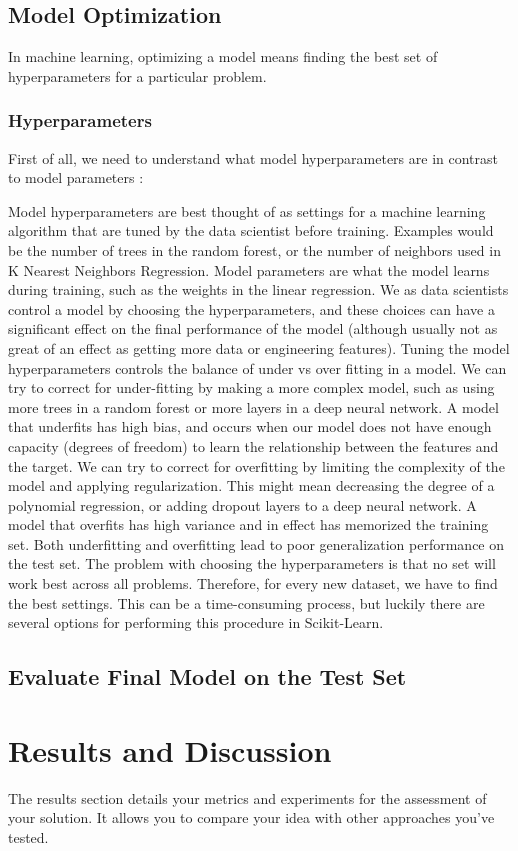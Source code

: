 \documentclass{article}
\begin{document}
\subsection*{Model Optimization}
In machine learning, optimizing a model means finding the best set of hyperparameters for a particular problem.

\subsubsection*{Hyperparameters}
First of all, we need to understand what model hyperparameters are in contrast to model parameters :

Model hyperparameters are best thought of as settings for a machine learning algorithm that are tuned by the data scientist before training. Examples would be the number of trees in the random forest, or the number of neighbors used in K Nearest Neighbors Regression.
Model parameters are what the model learns during training, such as the weights in the linear regression. We as data scientists control a model by choosing the hyperparameters, and these choices can have a significant effect on the final performance of the model (although usually not as great of an effect as getting more data or engineering features). Tuning the model hyperparameters controls the balance of under vs over fitting in a model. We can try to correct for under-fitting by making a more complex model, such as using more trees in a random forest or more layers in a deep neural network. A model that underfits has high bias, and occurs when our model does not have enough capacity (degrees of freedom) to learn the relationship between the features and the target. We can try to correct for overfitting by limiting the complexity of the model and applying regularization. This might mean decreasing the degree of a polynomial regression, or adding dropout layers to a deep neural network. A model that overfits has high variance and in effect has memorized the training set. Both underfitting and overfitting lead to poor generalization performance on the test set.
The problem with choosing the hyperparameters is that no set will work best across all problems. Therefore, for every new dataset, we have to find the best settings. This can be a time-consuming process, but luckily there are several options for performing this procedure in Scikit-Learn.


\subsection*{Evaluate Final Model on the Test Set}



\section*{Results and Discussion}
The results section details your metrics and experiments for the assessment of your solution. It allows you to compare your idea with other approaches you've tested. 

\nocite{*}


\end{document}

